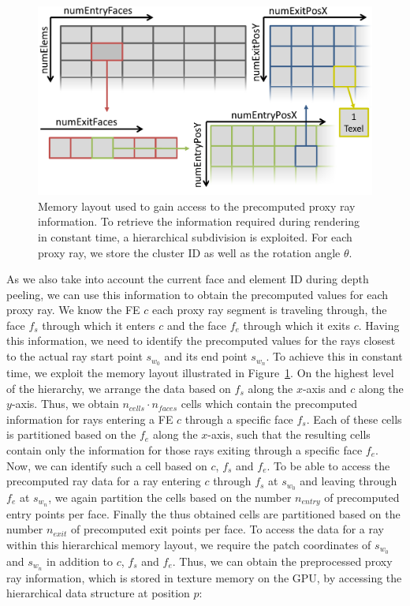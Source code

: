 \documentclass[review,journal]{vgtc}         %
\begin{document}
\begin{figure}[t]
    \centering
    \includegraphics[width=\linewidth]{figures/curvetexmap-memorylayout}
    \caption{Memory layout used to gain access to the precomputed proxy ray information. To retrieve the information required during rendering in constant time, a hierarchical subdivision is exploited. For each proxy ray, we store the cluster ID as well as the rotation angle $\theta$.}
    \label{fig:memorylayout}
\end{figure}
As we also take into account the current face and element ID during depth peeling, we can use this information to obtain the precomputed values for each proxy ray. We know the FE $c$ each proxy ray segment is traveling through, the face $f_s$ through which it enters $c$ and the face $f_e$ through which it exits $c$. Having this information, we need to identify the precomputed values for the rays closest to the actual ray start point $s_{w_0}$ and its end point $s_{w_n}$. To achieve this in constant time, we exploit the memory layout illustrated in Figure~\ref{fig:memorylayout}. On the highest level of the hierarchy, we arrange the data based on $f_s$ along the $x$-axis and $c$ along the $y$-axis. Thus, we obtain $n_{cells} \cdot n_{faces}$ cells which contain the precomputed information for rays entering a FE $c$ through a specific face $f_s$. Each of these cells is partitioned based on the $f_e$ along the $x$-axis, such that the resulting cells contain only the information for those rays exiting through a specific face $f_e$. Now, we can identify such a cell based on $c$, $f_s$ and $f_e$. To be able to access the precomputed ray data for a ray entering $c$ through $f_s$ at $s_{w_0}$ and leaving through $f_e$ at $s_{w_n}$, we again partition the cells based on the number $n_{entry}$ of precomputed entry points per face. Finally the thus obtained cells are partitioned based on the number $n_{exit}$ of precomputed exit points per face. To access the data for a ray within this hierarchical memory layout, we require the patch coordinates of $s_{w_0}$ and $s_{w_n}$ in addition to $c$, $f_s$ and $f_e$. Thus, we can obtain the preprocessed proxy ray information, which is stored in texture memory on the GPU, by accessing the hierarchical data structure at position $p$:
\end{document}
